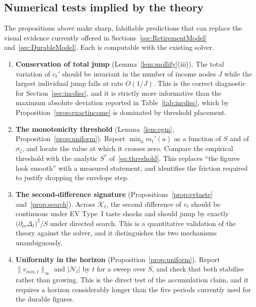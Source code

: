 \subsection{Numerical tests implied by the theory}
\label{subsec:smooth_tests}

The propositions above make sharp, falsifiable predictions that can replace the visual
evidence currently offered in Sections~\ref{sec:RetirementModel}
and~\ref{sec:DurableModel}. Each is computable with the existing solver.

\begin{enumerate}
    \item \textbf{Conservation of total jump} (Lemma~\ref{lem:mollify}(iii)). The total
    variation of $c_t'$ should be invariant in the number of income nodes $J$ while the
    largest individual jump falls at rate $O(1/J)$. This is the correct diagnostic for
    Section~\ref{sec:incdisc}, and it is strictly more informative than the maximum
    absolute deviation reported in Table~\ref{tab:incdisc}, which by
    Proposition~\ref{prop:exactincome} is dominated by threshold placement.

    \item \textbf{The monotonicity threshold} (Lemma~\ref{lem:egm},
    Proposition~\ref{prop:uniform}). Report $\min_a m_t'(a)$ as a function of $S$ and of
    $\sigma_\zeta$, and locate the value at which it crosses zero. Compare the
    empirical threshold with the analytic $S^{\ast}$ of~\eqref{eq:threshold}. This
    replaces ``the figures look smooth'' with a measured statement, and identifies the
    friction required to justify dropping the envelope step.

    \item \textbf{The second-difference signature} (Propositions~\ref{prop:evtaste}
    and~\ref{prop:search}). Across $\mathcal{K}_t$, the second difference of $v_t$
    should be continuous under EV Type~I taste shocks and should jump by exactly
    $\big(\partial_m\Delta_t\big)^{2}/S$ under directed search. This is a quantitative
    validation of the theory against the solver, and it distinguishes the two
    mechanisms unambiguously.

    \item \textbf{Uniformity in the horizon} (Proposition~\ref{prop:uniform}). Report
    $\|v_{mm,t}\|_{\infty}$ and $|\mathcal{N}_t|$ by $t$ for a sweep over $S$, and check
    that both stabilise rather than growing. This is the direct test of the accumulation
    claim, and it requires a horizon considerably longer than the five periods currently
    used for the durable figures.


\end{enumerate}
